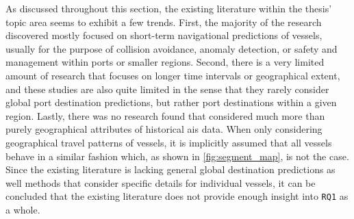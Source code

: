 As discussed throughout this section, the existing literature within the thesis' topic area seems to exhibit a few trends. First, the majority of the research discovered mostly focused on short-term navigational predictions of vessels, usually for the purpose of collision avoidance, anomaly detection, or safety and management within ports or smaller regions. Second, there is a very limited amount of research that focuses on longer time intervals or geographical extent, and these studies are also quite limited in the sense that they rarely consider global port destination predictions, but rather port destinations within a given region. Lastly, there was no research found that considered much more than purely geographical attributes of historical \acrshort{ais} data. When only considering geographical travel patterns of vessels, it is implicitly assumed that all vessels behave in a similar fashion which, as shown in \cref{fig:segment_map}, is not the case. Since the existing literature is lacking general global destination predictions as well methods that consider specific details for individual vessels, it can be concluded that the existing literature does not provide enough insight into \texttt{RQ1} as a whole.


